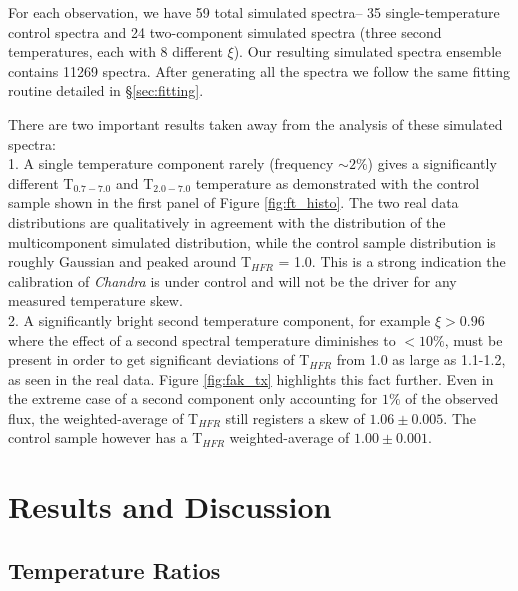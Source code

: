 \documentclass{emulateapj}
\newcommand{\tf}{T$_{HFR}$ }
\newcommand{\hard}{T$_{2.0-7.0}$ }
\newcommand{\full}{T$_{0.7-7.0}$ }
\begin{document}
For each observation, we have 59 total simulated spectra-- 35
single-temperature control spectra and 24 two-component simulated
spectra (three second temperatures, each with 8 different $\xi$). Our
resulting simulated spectra ensemble contains 11269 spectra. After
generating all the spectra we follow the same fitting routine detailed
in \S\ref{sec:fitting}.

There are two important results taken away from the analysis of these
simulated spectra:\\
1. A single temperature component rarely (frequency $\sim 2\%$) gives
a significantly different \full and \hard temperature as demonstrated
with the control sample shown in the first panel of Figure
\ref{fig:ft_histo}. The two real data distributions are qualitatively
in agreement with the distribution of the multicomponent simulated
distribution, while the control sample distribution is roughly
Gaussian and peaked around \tf = 1.0. This is a strong indication the
calibration of {\textit{Chandra}} is under control and will not be the
driver for any measured temperature skew.\\
2. A significantly bright second temperature component, for
example $\xi > 0.96$ where the effect of a second spectral temperature
diminishes to $< 10\%$, must be present in order to get
significant deviations of \tf from 1.0 as large as 1.1-1.2, as seen in
the real data. Figure \ref{fig:fak_tx} highlights this fact further. Even
in the extreme case of a second component only accounting for $1\%$ of
the observed flux, the weighted-average of \tf still registers a
skew of $1.06\pm0.005$. The control sample however has a \tf
weighted-average of $1.00\pm0.001$.

\section{Results and Discussion} \label{sec:r&d}

\subsection{Temperature Ratios} \label{sec:tspecresults}
\end{document}
